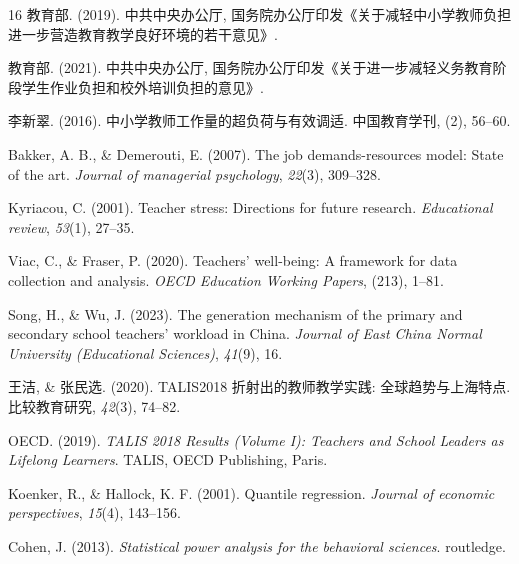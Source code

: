 \documentclass[zihao = -4, linespread = 1.5]{article}
\newcommand{\itsongti}[1]{{\JiangChengXieSongTi#1}}
\begin{document}
\begin{thebibliography}{16}
     教育部. (2019). 中共中央办公厅, 国务院办公厅印发《关于减轻中小学教师负担进一步营造教育教学良好环境的若干意见》.

     教育部. (2021). 中共中央办公厅, 国务院办公厅印发《关于进一步减轻义务教育阶段学生作业负担和校外培训负担的意见》.

     李新翠. (2016). 中小学教师工作量的超负荷与有效调适. \itsongti{中国教育学刊}, (2), 56--60.

     Bakker, A. B., \& Demerouti, E. (2007). The job demands-resources model: State of the art. \textit{Journal of managerial psychology}, \textit{22}(3), 309--328.

     Kyriacou, C. (2001). Teacher stress: Directions for future research. \textit{Educational review}, \textit{53}(1), 27--35.

     Viac, C., \& Fraser, P. (2020). Teachers' well-being: A framework for data collection and analysis. \textit{OECD Education Working Papers}, (213), 1--81.

     Song, H., \& Wu, J. (2023). The generation mechanism of the primary and secondary school teachers' workload in China. \textit{Journal of East China Normal University (Educational Sciences)}, \textit{41}(9), 16.

     王洁, \& 张民选. (2020). TALIS2018 折射出的教师教学实践: 全球趋势与上海特点. \itsongti{比较教育研究}, \textit{42}(3), 74--82.

     OECD. (2019). \textit{TALIS 2018 Results (Volume I): Teachers and School Leaders as Lifelong Learners}. TALIS, OECD Publishing, Paris.

     Koenker, R., \& Hallock, K. F. (2001). Quantile regression. \textit{Journal of economic perspectives}, \textit{15}(4), 143--156.

     Cohen, J. (2013). \textit{Statistical power analysis for the behavioral sciences}. routledge.
\end{thebibliography}
\end{document}
